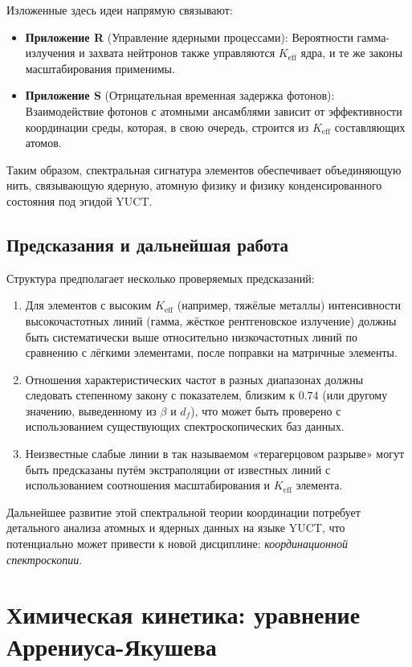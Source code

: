\documentclass[12pt,a4paper]{article}
\theoremstyle{remark}
\begin{document}
	Изложенные здесь идеи напрямую связывают:
	\begin{itemize}
		\item \textbf{Приложение R} (Управление ядерными процессами): Вероятности гамма-излучения и захвата нейтронов также управляются \(K_{\mathrm{eff}}\) ядра, и те же законы масштабирования применимы.
		\item \textbf{Приложение S} (Отрицательная временная задержка фотонов): Взаимодействие фотонов с атомными ансамблями зависит от эффективности координации среды, которая, в свою очередь, строится из \(K_{\mathrm{eff}}\) составляющих атомов.
	\end{itemize}
	Таким образом, спектральная сигнатура элементов обеспечивает объединяющую нить, связывающую ядерную, атомную физику и физику конденсированного состояния под эгидой YUCT.
	
	\subsection{Предсказания и дальнейшая работа}
	
	Структура предполагает несколько проверяемых предсказаний:
	\begin{enumerate}
		\item Для элементов с высоким \(K_{\mathrm{eff}}\) (например, тяжёлые металлы) интенсивности высокочастотных линий (гамма, жёсткое рентгеновское излучение) должны быть систематически выше относительно низкочастотных линий по сравнению с лёгкими элементами, после поправки на матричные элементы.
		\item Отношения характеристических частот в разных диапазонах должны следовать степенному закону с показателем, близким к \(0.74\) (или другому значению, выведенному из \(\beta\) и \(d_f\)), что может быть проверено с использованием существующих спектроскопических баз данных.
		\item Неизвестные слабые линии в так называемом «терагерцовом разрыве» могут быть предсказаны путём экстраполяции от известных линий с использованием соотношения масштабирования и \(K_{\mathrm{eff}}\) элемента.
	\end{enumerate}
	
	Дальнейшее развитие этой спектральной теории координации потребует детального анализа атомных и ядерных данных на языке YUCT, что потенциально может привести к новой дисциплине: \emph{координационной спектроскопии}.
	
	\section{Химическая кинетика: уравнение Аррениуса-Якушева}
	\label{sec:kinetics}
	
\end{document}
